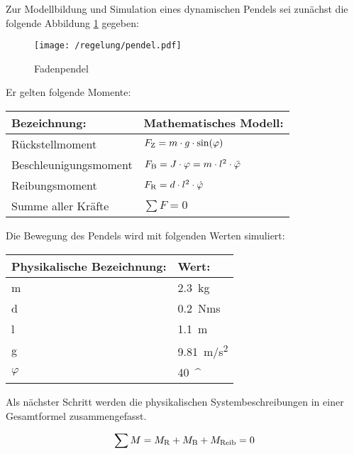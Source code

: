 Zur Modellbildung und Simulation eines dynamischen Pendels sei zunächst die folgende Abbildung \ref{fig:pendel} gegeben:

\begin{figure}[h]
	\centering
	\texttt{[image: /regelung/pendel.pdf]}
	\label{fig:pendel}
	\caption{Fadenpendel}
\end{figure}

Er gelten folgende Momente:

\begin{center}
	\begin{tabular}{ll}
		\toprule
		Bezeichnung:				&	Mathematisches Modell: \\
		\midrule
		Rückstellmoment				&	$F_\i{Z} = m \cdot g \cdot \si{sin}(\varphi) \label{rueckstellmoment}$ \\
		Beschleunigungsmoment		&	$F_\i{B} = J \cdot \varphi = m \cdot l^{2} \cdot \ddot\varphi\label{beschleunigungsmoment} $ \\
		Reibungsmoment				&	$F_\i{R} = d \cdot l^{2} \cdot \dot\varphi\label{reibungsmoment} $ \\
		Summe aller Kräfte			&	$\sum F = 0 \label{momentengleichgewicht} $ \\
		\bottomrule 
	\end{tabular}
\end{center}
		
Die Bewegung des Pendels wird mit folgenden Werten simuliert:

\begin{center}
	\begin{tabular}{ll}
		\toprule
		Physikalische Bezeichnung:	& Wert: \\
		\midrule
		m		& \SI{2,3}{kg} \\
		d		& \SI{0,2}{Nms} \\
		l		& \SI{1,1}{m} \\
		g		& \SI{9,81}{m/s^2}\\
		$\varphi$ & \SI{40}{^\circ}\\
		\bottomrule
	\end{tabular}
\end{center}
	
Als nächster Schritt werden die physikalischen Systembeschreibungen in einer Gesamtformel zusammengefasst. 

\begin{align}
	\sum M = M_\i{R} + M_\i{B} + M_\i{Reib} = 0
	\label{momentengleichgewichtgesamt} 
\end{align}


